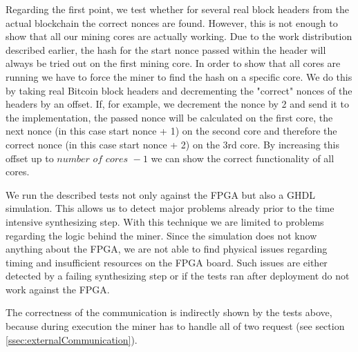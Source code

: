 Regarding the first point, we test whether for several real block headers from the actual blockchain the correct nonces are found. 
However, this is not enough to show that all our mining cores are actually working. 
Due to the work distribution described earlier, the hash for the start nonce passed within the header will always be tried out on the first mining core.
In order to show that all cores are running we have to force the miner to find the hash on a specific core.
We do this by taking real Bitcoin block headers and decrementing the "correct" nonces of the headers by an offset.
If, for example, we decrement the nonce by 2 and send it to the implementation, the passed nonce will be calculated on the first core, the next nonce (in this case start nonce + 1) on the second core and therefore the correct nonce (in this case start nonce + 2) on the 3rd core.
By increasing this offset up to $\textit{number of cores } - 1$ we can show the correct functionality of all cores.

We run the described tests not only against the FPGA but also a GHDL simulation.
This allows us to detect major problems already prior to the time intensive synthesizing step.
With this technique we are limited to problems regarding the logic behind the miner.
Since the simulation does not know anything about the FPGA, we are not able to find physical issues regarding timing and insufficient resources on the FPGA board. Such issues are either detected by a failing synthesizing step or if the tests ran after deployment do not work against the FPGA.

The correctness of the communication is indirectly shown by the tests above, because during execution the miner has to handle all of two request (see section \ref{ssec:externalCommunication}).

